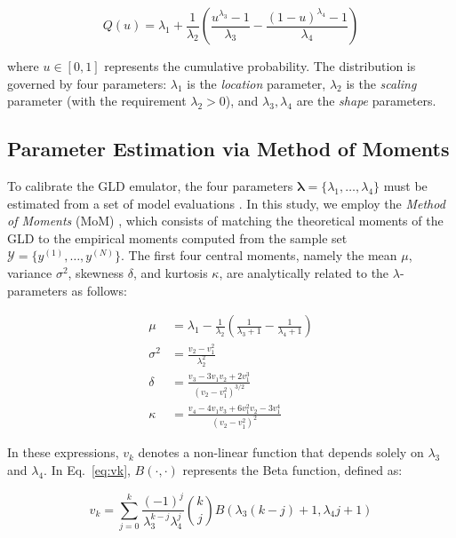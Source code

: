 \begin{equation}
Q(u) = \lambda_1 + \frac{1}{\lambda_2} \left( \frac{u^{\lambda_3} - 1}{\lambda_3} - \frac{(1 - u)^{\lambda_4} - 1}{\lambda_4} \right)
\label{eq:GLD_quantile}
\end{equation}

where $u \in [0, 1]$ represents the cumulative probability. The distribution is governed by four parameters: $\lambda_1$ is the \textit{location} parameter, $\lambda_2$ is the \textit{scaling} parameter (with the requirement $\lambda_2 > 0$), and $\lambda_3, \lambda_4$ are the \textit{shape} parameters.

\subsection{Parameter Estimation via Method of Moments}

To calibrate the GLD emulator, the four parameters $\boldsymbol{\lambda} = \{\lambda_1, \dots, \lambda_4\}$ must be estimated from a set of model evaluations \cite{chalabi2011gld,karian2010handbook,corlu2016estimating} . In this study, we employ the \textit{Method of Moments} (MoM) \cite{lakhany2000estimating}, which consists of matching the theoretical moments of the GLD to the empirical moments computed from the sample set $\mathcal{Y} = \{y^{(1)}, \dots, y^{(N)}\}$. The first four central moments, namely the mean $\mu$, variance $\sigma^2$, skewness $\delta$, and kurtosis $\kappa$, are analytically related to the $\lambda$-parameters as follows:

\begin{align}
\mu &= \lambda_1 - \frac{1}{\lambda_2} \left( \frac{1}{\lambda_3 + 1} - \frac{1}{\lambda_4 + 1} \right) \label{eq:mean} \\
\sigma^2 &= \frac{v_2 - v_1^2}{\lambda_2^2} \label{eq:var} \\
\delta &= \frac{v_3 - 3v_1v_2 + 2v_1^3}{(v_2 - v_1^2)^{3/2}} \label{eq:skew} \\
\kappa &= \frac{v_4 - 4v_1v_3 + 6v_1^2v_2 - 3v_1^4}{(v_2 - v_1^2)^2} \label{eq:kurt}
\end{align}

In these expressions, $v_k$ denotes a non-linear function that depends solely on $\lambda_3$ and $\lambda_4$. In Eq.~\eqref{eq:vk}, $B(\cdot, \cdot)$ represents the Beta function, defined as:

\begin{equation}
v_k = \sum_{j=0}^{k} \frac{(-1)^j}{\lambda_3^{k-j} \lambda_4^j} \binom{k}{j} B(\lambda_3(k-j) + 1, \lambda_4j + 1) \label{eq:vk}
\end{equation}

